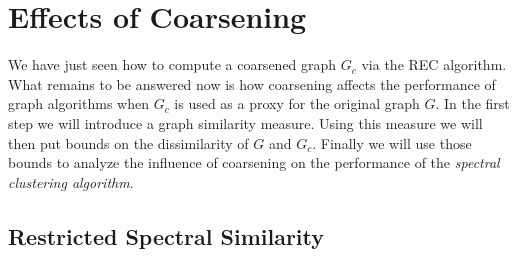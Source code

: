 \section{Effects of Coarsening}%
\label{sec:cons}

We have just seen how to compute a coarsened graph $G_c$ via the REC algorithm.
What remains to be answered now is how coarsening affects the performance of graph algorithms when $G_c$ is used as a proxy for the original graph $G$.
In the first step we will introduce a graph similarity measure.
Using this measure we will then put bounds on the dissimilarity of $G$ and $G_c$.
Finally we will use those bounds to analyze the influence of coarsening on the performance of the \textit{spectral clustering algorithm}.

\subsection{Restricted Spectral Similarity}%
\label{sec:cons:rss}

